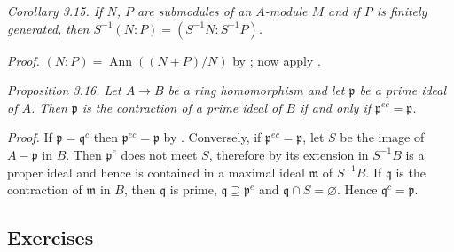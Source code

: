 \noindent\textit{Corollary 3.15. If $N$, $P$ are submodules of an $A$-module $M$ and if $P$ is finitely generated, then $S^{-1}(N:P)=(S^{-1}N:S^{-1}P)$.}

\noindent\textit{Proof.} $(N:P)=\operatorname{Ann}((N+P)/N)$ by ; now apply . \proofbox

\noindent\textit{Proposition 3.16. Let $A\longrightarrow B$ be a ring homomorphism and let $\mathfrak p$ be a prime ideal of $A$. Then $\mathfrak p$ is the contraction of a prime ideal of $B$ if and only if $\mathfrak p^{ec}=\mathfrak p$.}

\noindent\textit{Proof.} If $\mathfrak p=\mathfrak q^c$ then $\mathfrak p^{ec}=\mathfrak p$ by . Conversely, if $\mathfrak p^{ec}=\mathfrak p$, let $S$ be the image of $A-\mathfrak p$ in $B$. Then $\mathfrak p^e$ does not meet $S$, therefore by  its extension in $S^{-1}B$ is a proper ideal and hence is contained in a maximal ideal $\mathfrak m$ of $S^{-1}B$. If $\mathfrak q$ is the contraction of $\mathfrak m$ in $B$, then $\mathfrak q$ is prime, $\mathfrak q\supseteq\mathfrak p^e$ and $\mathfrak q\cap S=\varnothing$. Hence $\mathfrak q^c=\mathfrak p$. \proofbox

\subsection{Exercises}

